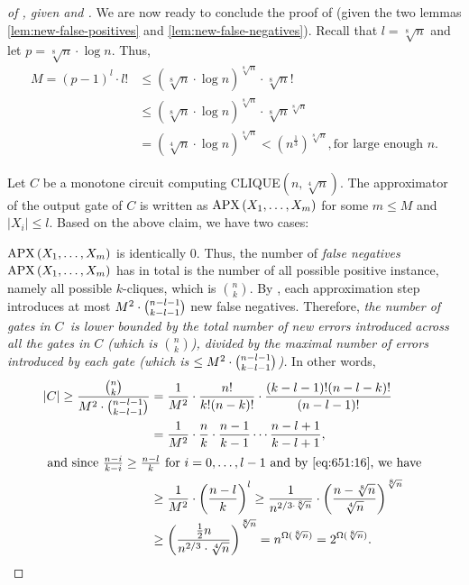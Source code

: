 \begin{proof}[of , given   and ]
We are now ready to conclude the proof of  (given the two lemmas \ref{lem:new-false-positives} and \ref{lem:new-false-negatives}).
Recall that $l=\sqrt[8]{n}$ and
let $p=\sqrt[8]{n} \cdot \log n$. 
Thus, 
\begin{equation}
\label{eq:651:16}
\begin{aligned}
M  = 
(p-1)^l \cdot l!
& \leq (\sqrt[8]{n} \cdot \log n)^{\sqrt[8]{n}} \cdot \sqrt[8]{n}! \\
& \leq (\sqrt[8]{n} \cdot \log n)^{\sqrt[8]{n}}
\cdot \sqrt[8]{n}^{\sqrt[8]{n}} \\
& =(\sqrt[4]{n} \cdot \log n)^{\sqrt[8]{n}}<
\left(n^{\frac{1}{3}}\right)^{\sqrt[8]{n}}, \text{
for large enough $n$.}
\end{aligned}
\end{equation}


Let $C$ be a monotone circuit computing CLIQUE$(n, \sqrt[4]{n})$.
%
%
%
The approximator of the output gate of $C$ is written as  $\operatorname{\mathrm{APX}}\left(X_1, \ldots, X_m\right)$ for some $m \leq M$ and $\left|X_i\right| \leq l$.
Based on the above claim, we have two cases:
\medskip 

\noindent {} $\operatorname{\mathrm{APX}}\left(X_1, \ldots, X_m\right) $ is identically 0. 
Thus, the number of \emph{false negatives} $\operatorname{\mathrm{APX}}\left(X_1, \ldots, X_m\right)$ has in total is the number of all possible positive instance, namely all possible $k$-cliques, which is $\binom{n}{k}$.
By ,  each approximation step introduces at most $M^2\cdot\binom{n-l-1}{k-l-1}$ new false negatives. Therefore,  \emph{the number of gates in  $C$\ is lower bounded by the total number of new errors introduced across all the  gates in $C$ (which is $\binom{n}{k}$), divided by the maximal number of errors introduced by each gate (which is $\le M^2\cdot\binom{n-l-1}{k-l-1}$).} In other words,
\begin{align*}
|C| \geq \frac{\binom{n}{k}}{M^2\cd\binom{n-l-1}{k-l-1}}
& = \frac{1}{M^2}\cd\frac{n!}{k!(n-k)!} \cdot \frac{(k-l-1)!(n-l-k)!}{(n-l-1)!} \\
& = \frac{1}{M^2}\cd \frac{n}{k} \cdot \frac{n-1}{k-1} \cdots \frac{n-l+1}{k-l+1},
\\
\intertext{
and since $\frac{n-i}{k-i} \geq \frac{n-l}{k}$
for $i=0,\dots,l-1$ and by \Cref{eq:651:16}, we have 
}
 & \geq \frac{1}{M^2}
 \cd\left(\frac{n-l}{k}\right)^l \geq
  \frac{1}{n^{2/3\cd\sqrt[8]{n}}}\cd
  \left(\frac{n-\sqrt[8]{n}}{\sqrt[4]{n}}\right)^{\sqrt[8]{n}} \\
& \ge
  \left(\frac{\frac{1}{2}n}{{n^{2/3}}\cd\sqrt[4]{n}}\right)^{\sqrt[8]{n}}
=
  n^{\Omega(\sqrt[8]{n})}
= 2^{\Omega(\sqrt[8]{n})}.
\end{align*}



\end{proof}
